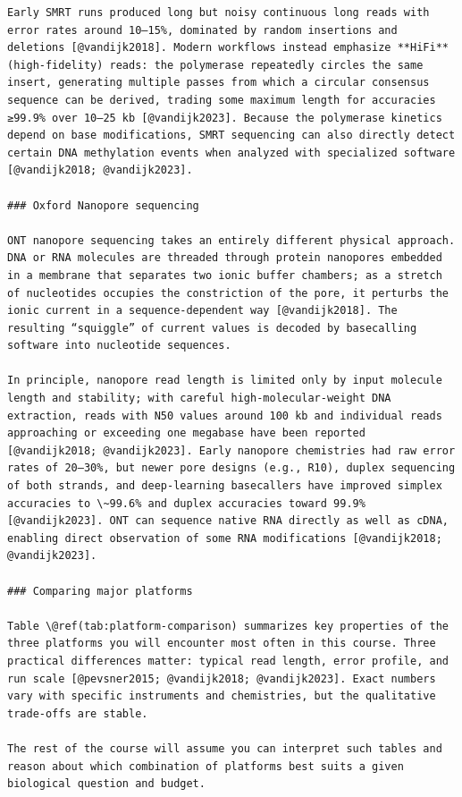 \documentclass[
  letterpaper,
  DIV=11,
  numbers=noendperiod]{scrreprt}
\begin{document}
\begin{verbatim}
Early SMRT runs produced long but noisy continuous long reads with error rates around 10–15%, dominated by random insertions and deletions [@vandijk2018]. Modern workflows instead emphasize **HiFi** (high‑fidelity) reads: the polymerase repeatedly circles the same insert, generating multiple passes from which a circular consensus sequence can be derived, trading some maximum length for accuracies ≥99.9% over 10–25 kb [@vandijk2023]. Because the polymerase kinetics depend on base modifications, SMRT sequencing can also directly detect certain DNA methylation events when analyzed with specialized software [@vandijk2018; @vandijk2023].

### Oxford Nanopore sequencing

ONT nanopore sequencing takes an entirely different physical approach. DNA or RNA molecules are threaded through protein nanopores embedded in a membrane that separates two ionic buffer chambers; as a stretch of nucleotides occupies the constriction of the pore, it perturbs the ionic current in a sequence‑dependent way [@vandijk2018]. The resulting “squiggle” of current values is decoded by basecalling software into nucleotide sequences.

In principle, nanopore read length is limited only by input molecule length and stability; with careful high‑molecular‑weight DNA extraction, reads with N50 values around 100 kb and individual reads approaching or exceeding one megabase have been reported [@vandijk2018; @vandijk2023]. Early nanopore chemistries had raw error rates of 20–30%, but newer pore designs (e.g., R10), duplex sequencing of both strands, and deep‑learning basecallers have improved simplex accuracies to \~99.6% and duplex accuracies toward 99.9% [@vandijk2023]. ONT can sequence native RNA directly as well as cDNA, enabling direct observation of some RNA modifications [@vandijk2018; @vandijk2023].

### Comparing major platforms

Table \@ref(tab:platform-comparison) summarizes key properties of the three platforms you will encounter most often in this course. Three practical differences matter: typical read length, error profile, and run scale [@pevsner2015; @vandijk2018; @vandijk2023]. Exact numbers vary with specific instruments and chemistries, but the qualitative trade‑offs are stable.

The rest of the course will assume you can interpret such tables and reason about which combination of platforms best suits a given biological question and budget.


\end{verbatim}
\end{document}
